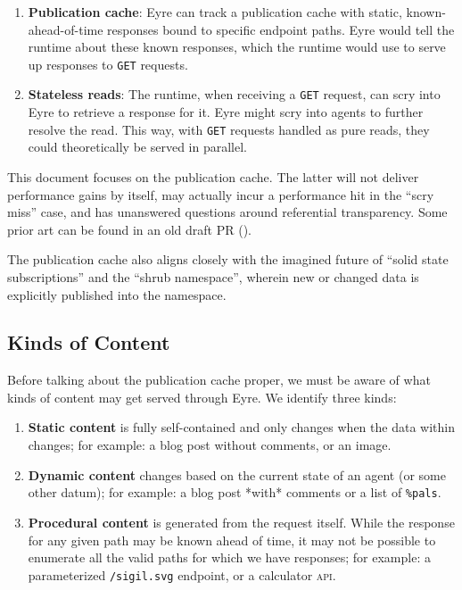 \documentclass[twoside]{article}
\begin{document}
\begin{enumerate}
  \item  {\bf Publication cache}: Eyre can track a publication cache with static, known-ahead-of-time responses bound to specific endpoint paths. Eyre would tell the runtime about these known responses, which the runtime would use to serve up responses to \texttt{GET} requests.
  \item  {\bf Stateless reads}: The runtime, when receiving a \texttt{GET} request, can scry into Eyre to retrieve a response for it. Eyre might scry into agents to further resolve the read. This way, with \texttt{GET} requests handled as pure reads, they could theoretically be served in parallel.
\end{enumerate}

This document focuses on the publication cache. The latter will not deliver performance gains by itself, may actually incur a performance hit in the ``scry miss'' case, and has unanswered questions around referential transparency. Some prior art can be found in an old draft PR ().

The publication cache also aligns closely with the imagined future of ``solid state subscriptions'' and the ``shrub namespace'', wherein new or changed data is explicitly published into the namespace.

\subsection{Kinds of Content}

Before talking about the publication cache proper, we must be aware of what kinds of content may get served through Eyre. We identify three kinds:

\begin{enumerate}
  \item  {\bf Static content} is fully self-contained and only changes when the data within changes; for example: a blog post without comments, or an image.
  \item  {\bf Dynamic content} changes based on the current state of an agent (or some other datum); for example: a blog post *with* comments or a list of \lstinline[style=inlinecode]{%pals}.
  \item  {\bf Procedural content} is generated from the request itself. While the response for any given path may be known ahead of time, it may not be possible to enumerate all the valid paths for which we have responses; for example: a parameterized \lstinline[style=inlinecode]{/sigil.svg} endpoint, or a calculator \textsc{api}.
\end{enumerate}
\end{document}
